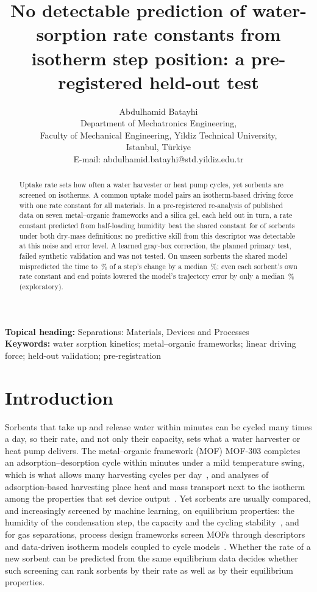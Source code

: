 \documentclass[12pt]{article}
\title{No detectable prediction of water-sorption rate constants from isotherm step position: a pre-registered held-out test}
\author{Abdulhamid Batayhi\\ Department of Mechatronics Engineering,\\ Faculty of Mechanical Engineering, Yildiz
Technical University,\\ \ID{34220} Istanbul, T\"urkiye\\ E-mail: abdulhamid.batayhi@std.yildiz.edu.tr}
\date{}
\begin{document}
\maketitle

\begin{abstract}
Uptake rate sets how often a water harvester or heat pump cycles, yet sorbents are screened on isotherms. A common
uptake model pairs an isotherm-based driving force with one rate constant for all materials. In a pre-registered
re-analysis of published data on seven metal--organic frameworks and a silica gel, each held out in turn, a rate
constant predicted from half-loading humidity beat the shared constant for  of 
sorbents under both dry-mass definitions: no predictive skill from this descriptor was detectable at this noise and
error level. A learned gray-box correction, the planned primary test, failed synthetic validation and was not tested.
On unseen sorbents the shared model mispredicted the time to \,\% of a step's change by a median
\,\%; even each sorbent's own rate constant and end points lowered the model's trajectory error by
only a median \,\% (exploratory).
\end{abstract}

\noindent\textbf{Topical heading:} Separations: Materials, Devices and Processes\\
\textbf{Keywords:} water sorption kinetics; metal--organic frameworks; linear driving force; held-out validation;
pre-registration

\section{Introduction}

Sorbents that take up and release water within minutes can be cycled many times a day, so their rate, and not only
their capacity, sets what a water harvester or heat pump delivers. The metal--organic framework (MOF) MOF-303
completes an adsorption--desorption
cycle within minutes under a mild temperature swing, which is what allows many harvesting cycles per
day~\cite{Hanikel2019Rapid}, and analyses of adsorption-based harvesting place heat and mass transport next to the
isotherm among the properties that set device output~\cite{LaPotin2019Adsorption}. Yet sorbents are usually
compared, and increasingly screened by machine learning, on equilibrium properties: the humidity of the
condensation step, the capacity and the cycling stability~\cite{Furukawa2014Water,Harriman2025Optimizing,
Alkhatib2026Machine,Zheng2023Shaping}, and for gas separations, process design frameworks screen MOFs through
descriptors and data-driven isotherm models coupled to cycle models~\cite{Zhang2022Descriptor,Zhang2022Matching}.
Whether the rate of a new sorbent can be predicted from the same equilibrium
data decides whether such screening can rank sorbents by their rate as well as by their equilibrium properties.
\end{document}
